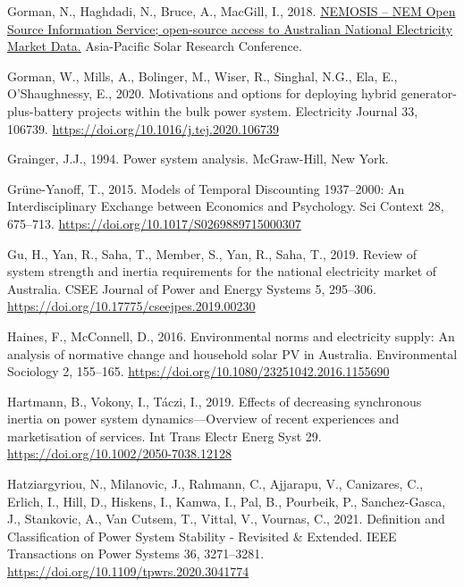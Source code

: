 \documentclass[12pt,a4paper,]{report}
\newlength{\cslhangindent}
\newenvironment{CSLReferences}[2] %
 {%
  \setlength{\parindent}{0pt}
  \ifodd #1 \everypar{\setlength{\hangindent}{\cslhangindent}}\ignorespaces\fi
  \ifnum #2 > 0
  \setlength{\parskip}{#2\baselineskip}
  \fi
 }%
 {}
\begin{document}
\begin{CSLReferences}{1}{0}
\leavevmode{}%
Gorman, N., Haghdadi, N., Bruce, A., MacGill, I., 2018.
\href{https://www.researchgate.net/publication/329798805}{{NEMOSIS} --
{NEM Open Source Information Service}; open-source access to {Australian
National Electricity Market Data}.} Asia-Pacific Solar Research
Conference.

\leavevmode{}%
Gorman, W., Mills, A., Bolinger, M., Wiser, R., Singhal, N.G., Ela, E.,
O'Shaughnessy, E., 2020. Motivations and options for deploying hybrid
generator-plus-battery projects within the bulk power system.
Electricity Journal 33, 106739.
\url{https://doi.org/10.1016/j.tej.2020.106739}

\leavevmode{}%
Grainger, J.J., 1994. Power system analysis. {McGraw-Hill}, {New York}.

\leavevmode{}%
Grüne-Yanoff, T., 2015. Models of {Temporal Discounting} 1937--2000: {An
Interdisciplinary Exchange} between {Economics} and {Psychology}. Sci
Context 28, 675--713. \url{https://doi.org/10.1017/S0269889715000307}

\leavevmode{}%
Gu, H., Yan, R., Saha, T., Member, S., Yan, R., Saha, T., 2019. Review
of system strength and inertia requirements for the national electricity
market of {Australia}. CSEE Journal of Power and Energy Systems 5,
295--306. \url{https://doi.org/10.17775/cseejpes.2019.00230}

\leavevmode{}%
Haines, F., McConnell, D., 2016. Environmental norms and electricity
supply: An analysis of normative change and household solar {PV} in
{Australia}. Environmental Sociology 2, 155--165.
\url{https://doi.org/10.1080/23251042.2016.1155690}

\leavevmode{}%
Hartmann, B., Vokony, I., Táczi, I., 2019. Effects of decreasing
synchronous inertia on power system dynamics---{Overview} of recent
experiences and marketisation of services. Int Trans Electr Energ Syst
29. \url{https://doi.org/10.1002/2050-7038.12128}

\leavevmode{}%
Hatziargyriou, N., Milanovic, J., Rahmann, C., Ajjarapu, V., Canizares,
C., Erlich, I., Hill, D., Hiskens, I., Kamwa, I., Pal, B., Pourbeik, P.,
Sanchez-Gasca, J., Stankovic, A., Van Cutsem, T., Vittal, V., Vournas,
C., 2021. Definition and {Classification} of {Power System Stability} -
{Revisited} \& {Extended}. IEEE Transactions on Power Systems 36,
3271--3281. \url{https://doi.org/10.1109/tpwrs.2020.3041774}


\end{CSLReferences}
\end{document}
